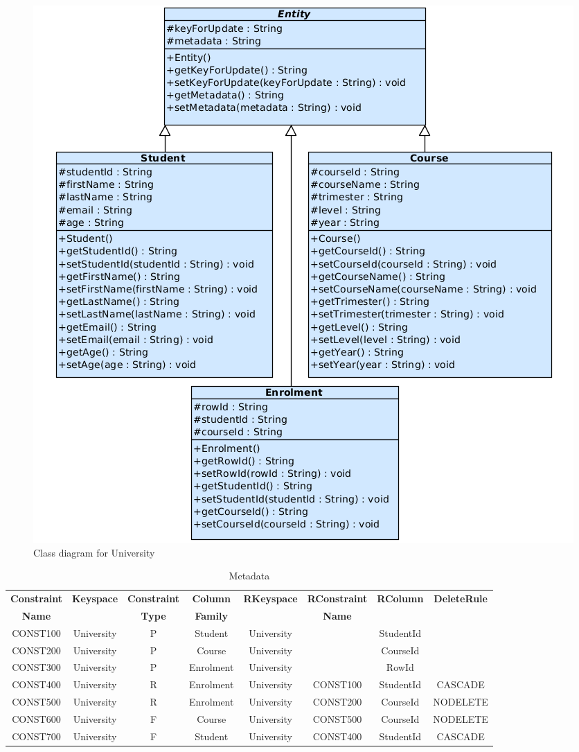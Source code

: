 \begin{figure}[H] 
		\centering
		\includegraphics[width=1\textwidth]{./figure/uml/example.png}
		\caption{Class diagram for University}\label{fexp:ClassDiagram}
	\end{figure} 
	
\begin{table}[h] \label{texp:ListConstraints}
\centering
\caption{Metadata}	
	\begin{tabular}{CCC CCC CC}
		\toprule
		\bfseries Constraint & \bfseries Keyspace & \bfseries Constraint &
		\bfseries Column & \bfseries RKeyspace & \bfseries RConstraint &
		\bfseries RColumn & \bfseries DeleteRule\\[-6pt]
		\bfseries Name & & \bfseries Type & \bfseries Family & & \bfseries Name \\
		\midrule
		CONST100 & University & P & Student & University & & StudentId &\\
		\rc CONST200 & University & P & Course & University & & CourseId &\\
		CONST300 & University & P & Enrolment & University & & RowId &\\
		\rc CONST400 & University & R & Enrolment & University & CONST100 & StudentId
		& CASCADE\\
		CONST500 & University & R & Enrolment & University & CONST200 & CourseId &
		NODELETE\\
		\rc CONST600 & University & F & Course & University & CONST500 & CourseId &
		NODELETE\\
		CONST700 & University & F & Student & University & CONST400 & StudentId &
		CASCADE\\
		\bottomrule
	\end{tabular}
\end{table}


